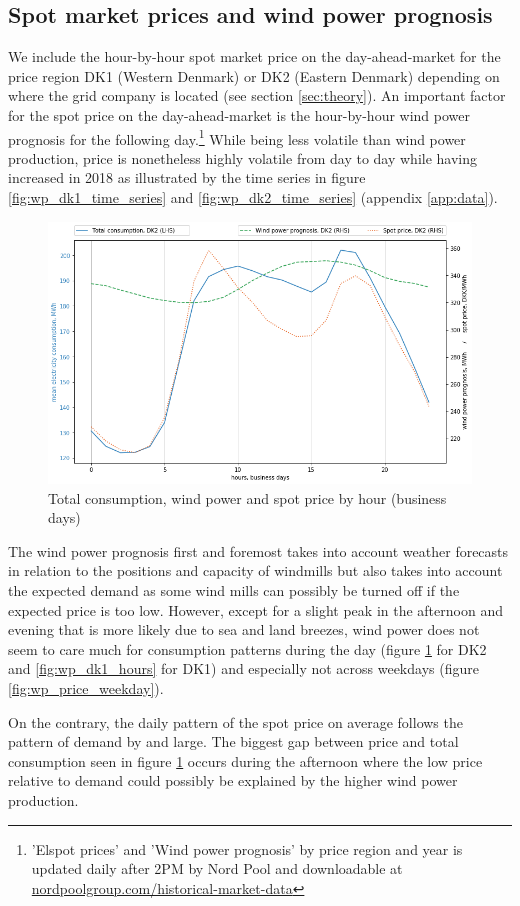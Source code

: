 \subsection{Spot market prices and wind power prognosis}
\label{subsec:d_spot}
We include the hour-by-hour spot market price on the day-ahead-market for the price region DK1 (Western Denmark) or DK2 (Eastern Denmark) depending on where the grid company is located (see section \ref{sec:theory}). An important factor for the spot price on the day-ahead-market is the hour-by-hour wind power prognosis for the following day.\footnote{'Elspot prices' and 'Wind power prognosis' by price region and year is updated daily after 2PM by Nord Pool and downloadable at \href{https://www.nordpoolgroup.com/historical-market-data/}{nordpoolgroup.com/historical-market-data}} While being less volatile than wind power production, price is nonetheless highly volatile from day to day while having increased in 2018 as illustrated by the time series in figure \ref{fig:wp_dk1_time_series} and \ref{fig:wp_dk2_time_series} (appendix \ref{app:data}).
\begin{figure}[H]
  \centering
  \caption{Total consumption, wind power and spot price by hour (business days)}
  \label{fig:trio_DK2_hours}
    \includegraphics[width=1 \textwidth]{03_figures/trio_DK2_hours, business days}
\end{figure}
The wind power prognosis first and foremost takes into account weather forecasts in relation to the positions and capacity of windmills but also takes into account the expected demand as some wind mills can possibly be turned off if the expected price is too low. However, except for a slight peak in the afternoon and evening that is more likely due to sea and land breezes, wind power does not seem to care much for consumption patterns during the day (figure \ref{fig:trio_DK2_hours} for DK2 and \ref{fig:wp_dk1_hours} for DK1) and especially not across weekdays (figure \ref{fig:wp_price_weekday}).
\par
On the contrary, the daily pattern of the spot price on average follows the pattern of demand by and large. The biggest gap between price and total consumption seen in figure \ref{fig:trio_DK2_hours} occurs during the afternoon where the low price relative to demand could possibly be explained by the higher wind power production.



